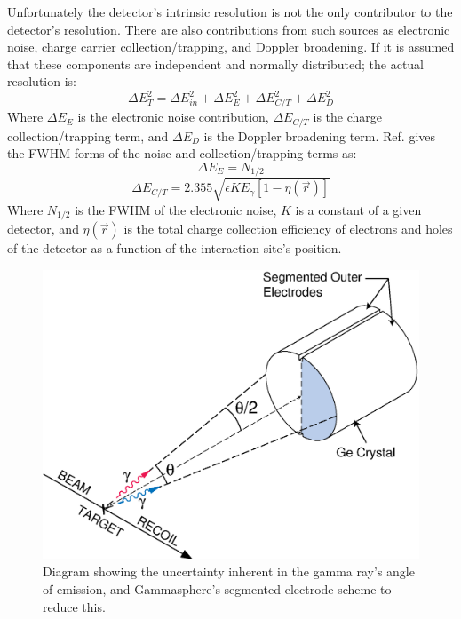 Unfortunately the detector's intrinsic resolution is not the only contributor to the detector's resolution. There are also contributions from such sources as electronic noise, charge carrier collection/trapping, and Doppler broadening. If it is assumed that these components are independent and normally distributed; the actual resolution is:
\begin{equation}
\label{eqn:chp3-hpge-res} 
\Delta{}E_{T}^2 = \Delta{}E_{in}^2 + \Delta{}E_{E}^2 + \Delta{}E_{C/T}^2 + \Delta{}E_{D}^2
\end{equation}
Where $\Delta{}E_{E}$ is the electronic noise contribution, $\Delta{}E_{C/T}$ is the charge collection/trapping term, and $\Delta{}E_{D}$ is the Doppler broadening term. Ref. \cite{trappingResolution} gives the FWHM forms of the noise and collection/trapping terms as:
\begin{equation}
\label{eqn:chp3-hpge-res-noise} 
\Delta{}E_{E} = N_{1/2}
\end{equation}
\begin{equation}
\label{eqn:chp3-hpge-res-ct} 
\Delta{}E_{C/T} = 2.355\sqrt{\epsilon{} K E_{\gamma{}} [1-\eta{}(\vec{r})]}
\end{equation}
Where $N_{1/2}$ is the FWHM of the electronic noise, $K$ is a constant of a given detector, and $\eta{}(\vec{r})$ is the total charge collection efficiency of electrons and holes of the detector as a function of the interaction site's position.

\begin{figure}
	\centerline{\includegraphics[height=0.3\textheight]{./img/c3/split_contact.eps}}
	\caption{Diagram showing the uncertainty inherent in the gamma ray's angle of emission, and Gammasphere's segmented electrode scheme to reduce this.\label{fig:chp3-doppler-split-contact}}
\end{figure}

